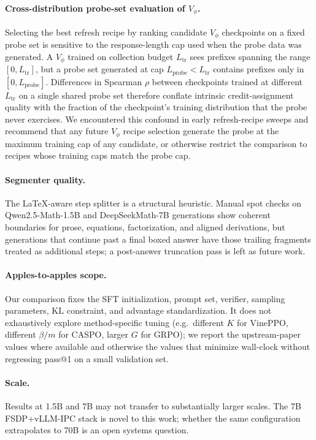 \documentclass[11pt]{article}
\newcommand{\caspo}{\textsc{CASPO}}
\newcommand{\grpo}{GRPO}
\newcommand{\vineppo}{VinePPO}
\begin{document}
\paragraph{Cross-distribution probe-set evaluation of $V_\phi$.}
Selecting the best refresh recipe by ranking candidate $V_\phi$ checkpoints
on a fixed probe set is sensitive to the response-length cap used when the
probe data was generated. A $V_\phi$ trained on collection budget $L_{\text{tr}}$
sees prefixes spanning the range $[0, L_{\text{tr}}]$, but a probe set
generated at cap $L_{\text{probe}} < L_{\text{tr}}$ contains prefixes only in
$[0, L_{\text{probe}}]$. Differences in Spearman $\rho$ between checkpoints
trained at different $L_{\text{tr}}$ on a single shared probe set therefore
conflate intrinsic credit-assignment quality with the fraction of the
checkpoint's training distribution that the probe never exercises. We
encountered this confound in early refresh-recipe sweeps and recommend
that any future $V_\phi$ recipe selection generate the probe at the
maximum training cap of any candidate, or otherwise restrict the
comparison to recipes whose training caps match the probe cap.

\paragraph{Segmenter quality.}
The LaTeX-aware step splitter is a structural heuristic. Manual spot checks
on Qwen2.5-Math-1.5B and DeepSeekMath-7B generations show coherent
boundaries for prose, equations, factorization, and aligned derivations,
but generations that continue past a final boxed answer have those trailing
fragments treated as additional steps; a post-answer truncation pass is
left as future work.

\paragraph{Apples-to-apples scope.}
Our comparison fixes the SFT initialization, prompt set, verifier, sampling
parameters, KL constraint, and advantage standardization. It does not
exhaustively explore method-specific tuning (e.g.\ different $K$ for
\vineppo{}, different $\beta/m$ for \caspo{}, larger $G$ for \grpo{}); we
report the upstream-paper values where available and otherwise the values
that minimize wall-clock without regressing pass@1 on a small validation set.

\paragraph{Scale.}
Results at 1.5B and 7B may not transfer to substantially larger scales. The
7B FSDP+vLLM-IPC stack is novel to this work; whether the same configuration
extrapolates to 70B is an open systems question.
\end{document}

